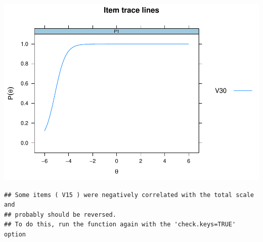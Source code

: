 \documentclass[
  english,
  man,floatsintext]{apa6}
\begin{document}
\includegraphics{ICC_project_files/figure-latex/unnamed-chunk-3-2.pdf}

\begin{verbatim}
## Some items ( V15 ) were negatively correlated with the total scale and 
## probably should be reversed.  
## To do this, run the function again with the 'check.keys=TRUE' option
\end{verbatim}
\end{document}
